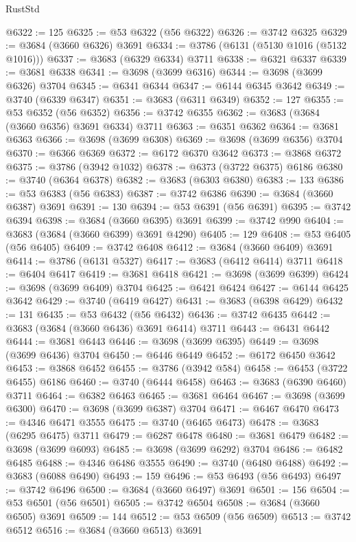 \begin{lexlean}{RustStd}
\begin{coremodule}
{\begin{coremodule}
{{{{{{{{{{{{{{{{{{{{{{{{{{{{{{{{{{{{{{{{{{{{{{{@6322 := 125
@6325 := @53 @6322 (@56 @6322)
@6326 := @3742 @6325
@6329 := @3684 (@3660 @6326) @3691
@6334 := @3786 (@6131 (@5130 @1016 (@5132 @1016)))
@6337 := @3683 (@6329 @6334) @3711
@6338 := @6321 @6337
@6339 := @3681 @6338
@6341 := @3698 (@3699 @6316)
@6344 := @3698 (@3699 @6326) @3704
@6345 := @6341 @6344
@6347 := @6144 @6345 @3642
@6349 := @3740 (@6339 @6347)
@6351 := @3683 (@6311 @6349)
@6352 := 127
@6355 := @53 @6352 (@56 @6352)
@6356 := @3742 @6355
@6362 := @3683 (@3684 (@3660 @6356) @3691 @6334) @3711
@6363 := @6351 @6362
@6364 := @3681 @6363
@6366 := @3698 (@3699 @6308)
@6369 := @3698 (@3699 @6356) @3704
@6370 := @6366 @6369
@6372 := @6172 @6370 @3642
@6373 := @3868 @6372
@6375 := @3786 (@3942 @1032)
@6378 := @6373 (@3722 @6375) @6186
@6380 := @3740 (@6364 @6378)
@6382 := @3683 (@6303 @6380)
@6383 := 133
@6386 := @53 @6383 (@56 @6383)
@6387 := @3742 @6386
@6390 := @3684 (@3660 @6387) @3691
@6391 := 130
@6394 := @53 @6391 (@56 @6391)
@6395 := @3742 @6394
@6398 := @3684 (@3660 @6395) @3691
@6399 := @3742 @990
@6404 := @3683 (@3684 (@3660 @6399) @3691 @4290)
@6405 := 129
@6408 := @53 @6405 (@56 @6405)
@6409 := @3742 @6408
@6412 := @3684 (@3660 @6409) @3691
@6414 := @3786 (@6131 @5327)
@6417 := @3683 (@6412 @6414) @3711
@6418 := @6404 @6417
@6419 := @3681 @6418
@6421 := @3698 (@3699 @6399)
@6424 := @3698 (@3699 @6409) @3704
@6425 := @6421 @6424
@6427 := @6144 @6425 @3642
@6429 := @3740 (@6419 @6427)
@6431 := @3683 (@6398 @6429)
@6432 := 131
@6435 := @53 @6432 (@56 @6432)
@6436 := @3742 @6435
@6442 := @3683 (@3684 (@3660 @6436) @3691 @6414) @3711
@6443 := @6431 @6442
@6444 := @3681 @6443
@6446 := @3698 (@3699 @6395)
@6449 := @3698 (@3699 @6436) @3704
@6450 := @6446 @6449
@6452 := @6172 @6450 @3642
@6453 := @3868 @6452
@6455 := @3786 (@3942 @584)
@6458 := @6453 (@3722 @6455) @6186
@6460 := @3740 (@6444 @6458)
@6463 := @3683 (@6390 @6460) @3711
@6464 := @6382 @6463
@6465 := @3681 @6464
@6467 := @3698 (@3699 @6300)
@6470 := @3698 (@3699 @6387) @3704
@6471 := @6467 @6470
@6473 := @4346 @6471 @3555
@6475 := @3740 (@6465 @6473)
@6478 := @3683 (@6295 @6475) @3711
@6479 := @6287 @6478
@6480 := @3681 @6479
@6482 := @3698 (@3699 @6093)
@6485 := @3698 (@3699 @6292) @3704
@6486 := @6482 @6485
@6488 := @4346 @6486 @3555
@6490 := @3740 (@6480 @6488)
@6492 := @3683 (@6088 @6490)
@6493 := 159
@6496 := @53 @6493 (@56 @6493)
@6497 := @3742 @6496
@6500 := @3684 (@3660 @6497) @3691
@6501 := 156
@6504 := @53 @6501 (@56 @6501)
@6505 := @3742 @6504
@6508 := @3684 (@3660 @6505) @3691
@6509 := 144
@6512 := @53 @6509 (@56 @6509)
@6513 := @3742 @6512
@6516 := @3684 (@3660 @6513) @3691
}}}}}}}}}}}}}}}}}}}}}}}}}}}}}}}}}}}}}}}}}}}}}}}
\end{coremodule}}
\end{coremodule}
\end{lexlean}
